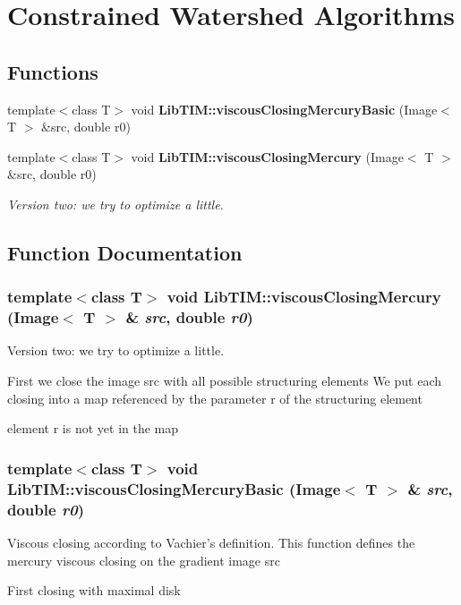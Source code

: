 \section{Constrained Watershed Algorithms}
\label{group__constrainedWatershed}
\subsection*{Functions}
\begin{CompactItemize}
\item 
template$<$class T$>$ void {\bf Lib\-TIM::viscous\-Closing\-Mercury\-Basic} (Image$<$ T $>$ \&src, double r0)
\item 
template$<$class T$>$ void {\bf Lib\-TIM::viscous\-Closing\-Mercury} (Image$<$ T $>$ \&src, double r0)
\begin{CompactList}\small\item\em Version two: we try to optimize a little. \item\end{CompactList}\end{CompactItemize}


\subsection{Function Documentation}
\subsubsection{\setlength{\rightskip}{0pt plus 5cm}template$<$class T$>$ void Lib\-TIM::viscous\-Closing\-Mercury (Image$<$ T $>$ \& {\em src}, double {\em r0})}\label{group__constrainedWatershed_ga1}


Version two: we try to optimize a little. 

First we close the image src with all possible structuring elements We put each closing into a map referenced by the parameter r of the structuring element

element r is not yet in the map 
\subsubsection{\setlength{\rightskip}{0pt plus 5cm}template$<$class T$>$ void Lib\-TIM::viscous\-Closing\-Mercury\-Basic (Image$<$ T $>$ \& {\em src}, double {\em r0})}\label{group__constrainedWatershed_ga0}


Viscous closing according to Vachier's definition. This function defines the mercury viscous closing on the gradient image src

First closing with maximal disk 